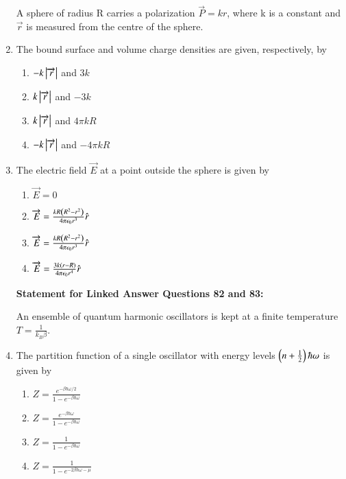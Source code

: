 \documentclass[journal]{IEEEtran}
\begin{document}
\begin{enumerate}[start=69]
A sphere of radius R carries a polarization $\overrightarrow{P}=kr$, where k is a constant and $\overrightarrow{r}$ is measured from the centre of the sphere.

\item The bound surface and volume charge densities are given, respectively, by
\begin{multicols}{2}
\begin{enumerate}
\item $-k\left\vert\overrightarrow{r}\right\vert$ and $3k$
\item $k\left\vert\overrightarrow{r}\right\vert$ and $-3k$
\item $k\left\vert\overrightarrow{r}\right\vert$ and $4\pi kR$
\item $-k\left\vert\overrightarrow{r}\right\vert$ and $-4\pi kR$
\end{enumerate}
\end{multicols}

\item The electric field $\overrightarrow{E}$ at a point outside the sphere is given by
\begin{multicols}{4}
\begin{enumerate}
\item $\overrightarrow{E}=0$
\item $\overrightarrow{E}=\frac{kR\left(R^2-r^2\right)}{4\pi\epsilon_0r^3}\hat{r}$
\item $\overrightarrow{E}=\frac{kR\left(R^2-r^2\right)}{4\pi\epsilon_0r^3}\hat{r}$
\item $\overrightarrow{E}=\frac{3k\left(r-R\right)}{4\pi\epsilon_0r^4}\hat{r}$
\end{enumerate}
\end{multicols}

    \textbf{Statement for Linked Answer Questions 82 and 83:}

An ensemble of quantum harmonic oscillators is kept at a finite temperature $T=\frac{1}{k_B\beta}$.

\item The partition function of a single oscillator with energy levels $\left(n+\frac{1}{2}\right)\hbar\omega$ is given by
\begin{multicols}{4}
\begin{enumerate}
\item $Z=\frac{e^{-\beta\hbar\omega/2}}{1-e^{-\beta\hbar\omega}}$
\item $Z=\frac{e^{-\beta\hbar\omega}}{1-e^{-\beta\hbar\omega}}$
\item $Z=\frac{1}{1-e^{-\beta\hbar\omega}}$
\item $Z=\frac{1}{1-e^{-2\beta\hbar\omega-\mu}}$
\end{enumerate}
\end{multicols}


\end{enumerate}
\end{document}
